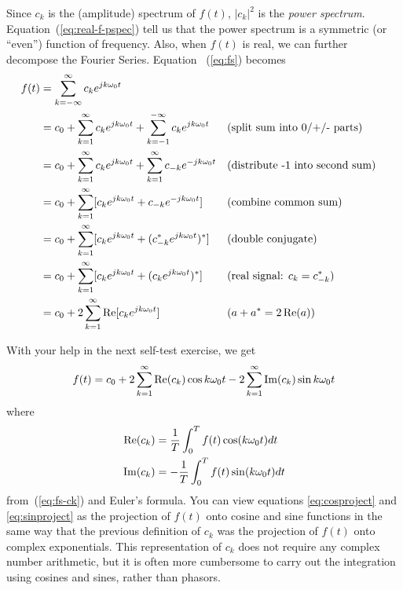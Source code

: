 Since $c_k$ is the (amplitude) spectrum of $f(t)$, $|c_k|^2$ is the
\emph{power spectrum}. Equation~(\ref{eq:real-f-pspec}) tell us that
the power  spectrum is a symmetric (or ``even'')
function of frequency. Also, when $f(t)$ is real, we can further
decompose the Fourier Series. Equation ~(\ref{eq:fs}) becomes
\begin{align}
f(t) &= \sum_{k=-\infty}^{\infty} c_k e^{j k\omega_0 t} \notag\\
&= c_0+\sum_{k=1}^{\infty} c_k e^{j k\omega_0 t}
+\sum_{k=-1}^{-\infty} c_k e^{jk\omega_0 t} 
&&\text{(split sum into 0/+/- parts)}
\notag\\
&= c_0+\sum_{k=1}^{\infty} c_k e^{jk\omega_0t}+
\sum_{k=1}^{\infty} c_{-k} e^{-jk\omega_0 t} 
&&\text{(distribute -1 into second sum)}
\notag\\
&= c_0+\sum_{k=1}^{\infty} [c_k e^{jk\omega_0t}+
c_{-k} e^{-jk\omega_0 t}] 
&&\text{(combine common sum)}
\notag\\
&= c_0+\sum_{k=1}^{\infty} [c_k e^{jk\omega_0t}+
(c_{-k}^* e^{jk\omega_0 t})^*] 
&&\text{(double conjugate)}
\notag\\
&= c_0+\sum_{k=1}^{\infty} [c_k e^{jk\omega_0t}+
(c_k e^{jk\omega_0 t})^*] 
&&\text{(real signal: $c_k = c_{-k}^*$)}
\notag\\
&= c_0+2\sum_{k=1}^{\infty} \operatorname{Re}[c_k e^{jk\omega_0t}]
&&\text{($a + a^* = 2\operatorname{Re}(a)$)}
\label{eq:fs-freal1}
\end{align}

With your help in the next self-test exercise, we get
\begin{equation}
f(t)=c_0+2\sum_{k=1}^{\infty} \operatorname{Re}(c_k)\cos k\omega_0t
-2\sum_{k=1}^{\infty} \operatorname{Im}(c_k)\sin k\omega_0t
\label{eq:fs-freal2}
\end{equation}
where 
\begin{align}
\operatorname{Re}(c_k) &= \frac{1}{T}\int_0^T f(t)\cos(k\omega_0t)dt \label{eq:cosproject}\\
\operatorname{Im}(c_k) &= -\frac{1}{T}\int_0^T f(t)\sin(k\omega_0t)dt \label{eq:sinproject}
\end{align}
from~(\ref{eq:fs-ck}) and Euler's formula. You can view equations \ref{eq:cosproject} and \ref{eq:sinproject} as the projection of $f(t)$ onto cosine and sine functions in the same way that the previous definition of $c_k$ was the projection of $f(t)$ onto complex exponentials. This representation of $c_k$ does not require any complex number arithmetic, but it is often more cumbersome to carry out the integration using cosines and sines, rather than phasors.

